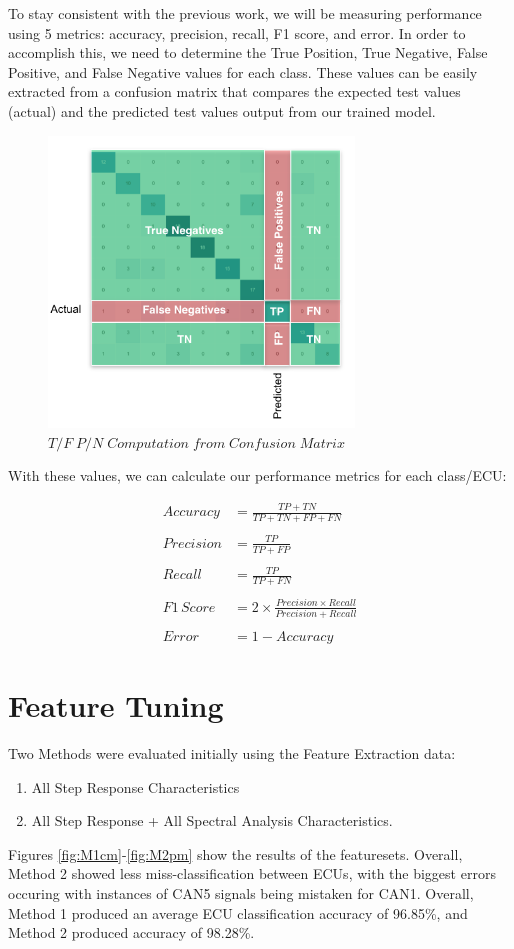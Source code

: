 \documentclass[conference]{IEEEtran}
\begin{document}
To stay consistent with the previous work, we will be measuring performance using 5 metrics: accuracy, precision, recall, F1 score, and error. In order to accomplish this, we need to determine the True Position, True Negative, False Positive, and False Negative values for each class. These values can be easily extracted from a confusion matrix that compares the expected test values (actual) and the predicted test values output from our trained model.

\begin{figure}[htb]
\centering
\includegraphics[width=3.2in]{figures/60_cm_pm.png}
\caption{$T/F  \; P/N \; Computation  \; from \; Confusion \; Matrix$ \cite{bell2020}}
\label{fig:CMPerfMetric}
\end{figure}

With these values, we can calculate our performance metrics for each class/ECU:

\begin{align*}
    Accuracy & = \frac{TP + TN}{TP + TN + FP + FN}\\\\
    Precision & = \frac{TP}{TP + FP}\\\\
    Recall & = \frac{TP}{TP + FN}\\\\
    F1\,Score & = 2 \times \frac{Precision \times Recall}{Precision + Recall}\\\\
    Error & = 1 - Accuracy
\end{align*}

\section{Feature Tuning}
Two Methods were evaluated initially using the Feature Extraction data:
\begin{enumerate}
    \item All Step Response Characteristics
    \item All Step Response + All Spectral Analysis Characteristics. 
\end{enumerate}
Figures \ref{fig:M1cm}-\ref{fig:M2pm} show the results of the featuresets. Overall, Method 2 showed less miss-classification between ECUs, with the biggest errors occuring with instances of CAN5 signals being mistaken for CAN1. Overall, Method 1 produced an average ECU classification accuracy of 96.85\%, and Method 2 produced accuracy of 98.28\%.
\end{document}
